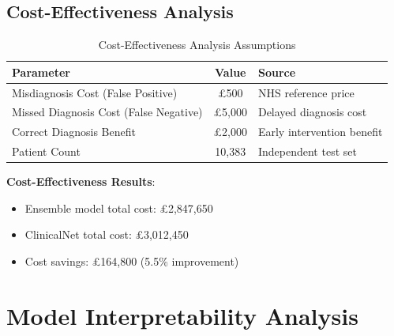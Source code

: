 \documentclass[12pt, a4paper]{article}
\begin{document}
\subsection{Cost-Effectiveness Analysis}
\begin{table}[htbp]
\centering

\begin{tabular}{@{}lcl@{}}
\toprule
\textbf{Parameter} & \textbf{Value} & \textbf{Source} \\ \midrule
Misdiagnosis Cost (False Positive) & \pounds500 & NHS reference price \\
Missed Diagnosis Cost (False Negative) & \pounds5,000 & Delayed diagnosis cost \\
Correct Diagnosis Benefit & \pounds2,000 & Early intervention benefit \\
Patient Count & 10,383 & Independent test set \\ \bottomrule
\end{tabular}%

\caption{Cost-Effectiveness Analysis Assumptions}
\label{tab:cost_effectiveness_assumptions}
\end{table}
\textbf{Cost-Effectiveness Results}:
\begin{itemize}
    \item Ensemble model total cost: \pounds2,847,650
    \item ClinicalNet total cost: \pounds3,012,450
    \item Cost savings: \pounds164,800 (5.5\% improvement)
\end{itemize}
\clearpage

\section{Model Interpretability Analysis}
\end{document}
